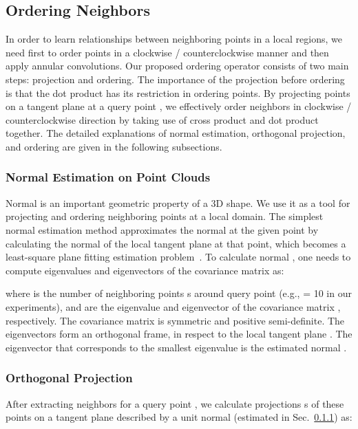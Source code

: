 \documentclass[10pt,twocolumn,letterpaper]{article}
\begin{document}
\subsection{Ordering Neighbors}
\label{sec:project_order}


In order to learn relationships between neighboring points in a local regions, we need first to order points in a clockwise / counterclockwise manner and then apply annular convolutions. Our proposed ordering operator consists of two main steps: projection and ordering. The importance of the projection before ordering is that the dot product has its restriction in ordering points. By projecting points on a tangent plane at a query point , we effectively order neighbors in clockwise / counterclockwise direction by taking use of cross product and dot product together. The detailed explanations of normal estimation, orthogonal projection, and ordering are given in the following subsections.
\vspace{-8mm}
\subsubsection{Normal Estimation on Point Clouds}
\label{sec:normal_estimation}
Normal is an important geometric property of a 3D shape. We use it as a tool for projecting and ordering neighboring points at a local domain. The simplest normal estimation method approximates the normal  at the given point  by calculating the normal of the local tangent plane  at that point, which becomes a least-square plane fitting estimation problem~\cite{RusuDoctoralDissertation}.
To calculate normal , one needs to compute eigenvalues and eigenvectors of the covariance matrix  as:
\vspace{-2mm}

where  is the number of neighboring points s around query point  (e.g.,  = 10 in our experiments),  and  are the  eigenvalue and eigenvector of the covariance matrix , respectively. The covariance matrix  is symmetric and positive semi-definite. The eigenvectors  form an orthogonal frame, in respect to the local tangent plane . The eigenvector  that corresponds to the smallest eigenvalue  is the estimated normal .
\vspace{-3mm}
\subsubsection{Orthogonal Projection}\vspace{-1mm}
After extracting neighbors  for a query point , we calculate projections s of these points on a tangent plane  described by a unit normal  (estimated in Sec.~\ref{sec:normal_estimation}) as:
\end{document}
